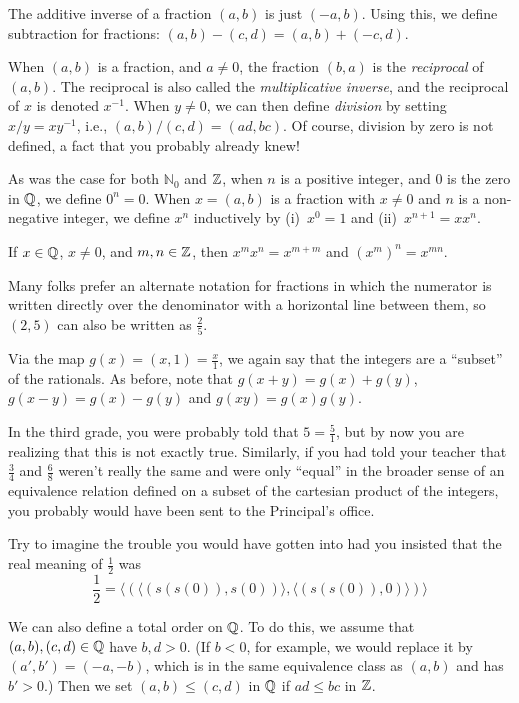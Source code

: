 The additive inverse of a fraction $(a,b)$ is just $(-a,b)$.
Using this, we define subtraction for fractions:
$(a,b)-(c,d)=(a,b)+(-c,d)$.

When $(a,b)$ is a fraction, and $a\neq 0$, the fraction $(b,a)$ is the 
\textit{reciprocal} of $(a,b)$.  The reciprocal is also
called the \textit{multiplicative inverse}, and the reciprocal 
of $x$ is denoted $x^{-1}$.  When $y\neq0$, we can then define
\textit{division} by setting $x/y=xy^{-1}$, i.e.,
$(a,b)/(c,d)=(ad, bc)$.  Of course, division by zero is not
defined, a fact that you probably already knew!

As was the case for  both $\mathbb{N}_0$ and $\mathbb{Z}$, when
$n$ is a positive integer, and $0$ is the zero in $\mathbb{Q}$,
we define $0^n=0$.  When $x=(a,b)$ is a fraction with $x\neq0$
and $n$ is a non-negative integer, we define $x^n$ inductively
by (i)~$x^0=1$ and (ii)~$x^{n+1}=xx^n$.

\begin{theorem}
If $x\in\mathbb{Q}$, $x\neq0$, and $m,n\in\mathbb{Z}$, then
$x^mx^n=x^{m+m}$ and $(x^m)^n=x^{mn}$.
\end{theorem}

Many folks prefer an alternate notation for fractions in
which the numerator is written directly over the denominator
with a horizontal line between them, so $(2,5)$ can
also be written as $\frac{2}{5}$.

Via the map $g(x) = (x,1)=\frac{x}{1}$, we again say that the integers
are a ``subset'' of the rationals.  As before, note that
$g(x+y) = g(x)+g(y)$, $g(x-y)=g(x)-g(y)$ and $g(xy)=g(x)g(y)$.

In the third grade,
you were probably told that $5 =\frac{5}{1}$, but by now
you are realizing that this is not exactly true.   
Similarly, if you had told your teacher that $\frac{3}{4}$ and
$\frac{6}{8}$ weren't really the same and were only ``equal'' in 
the broader sense of an equivalence relation defined on
a subset of the cartesian product of the integers, you
probably would have been sent to the Principal's office.

Try to imagine the trouble you would have gotten into had
you insisted that the real meaning
of $\frac{1}{2}$ was
\[
\frac{1}{2} =\langle(\langle(s(s(0)),s(0))\rangle,
  \langle(s(s(0)),0)\rangle)\rangle
\]

We can also define a total order on $\mathbb{Q}$. To do this, we assume
that $(a,b),(c,d)\in\mathbb{Q}$ have $b,d>0$. (If $b<0$, for example, we
would replace it by $(a',b')=(-a,-b)$, which is in the same
equivalence class as $(a,b)$ and has $b'>0$.) Then we set $(a,b)\leq
(c,d)$ in $\mathbb{Q}$ if $ad\leq bc$ in $\mathbb{Z}$.

